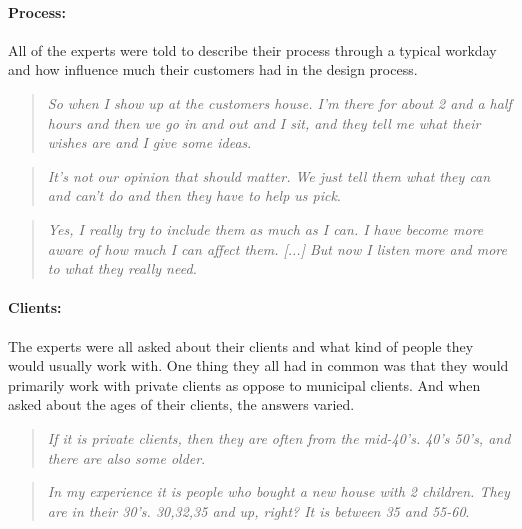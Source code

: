 		\paragraph*{Process:}
		All of the experts were told to describe their process through a typical workday and how influence much their customers had in the design process.
		\begin{quote}
			\textit{So when I show up at the customers house. I'm there for about 2 and a half hours and then we go in and out and I sit, and they tell me what their wishes are and I give some ideas}\label{quote:expertProcess1}.\\
		\end{quote}
	
		\begin{quote}
			\textit{It's not our opinion that should matter. We just tell them what they can and can't do and then they have to help us pick}\label{quote:expertProcess2}.\\
		\end{quote}
		
		\begin{quote}
			\textit{Yes, I really try to include them as much as I can. I have become more aware of how much I can affect them. [...] But now I listen more and more to what they really need. }\label{quote:expertProcess3}\\
		\end{quote}
		
		
		\paragraph*{Clients:}
		The experts were all asked about their clients and what kind of people they would usually work with. One thing they all had in common was that they would primarily work with private clients as oppose to municipal clients. And when asked about the ages of their clients, the answers varied. 
		
		\begin{quote}
			\textit{If it is private clients, then they are often from the mid-40's. 40’s 50’s, and there are also some older}\label{quote:expertClients1}.\\
		\end{quote}
		
		\begin{quote}
			\textit{In my experience it is people who bought a new house with 2 children. They are in their 30's. 30,32,35 and up, right? It is between 35 and 55-60}\label{quote:expertClients2}.\\
		\end{quote}
	
